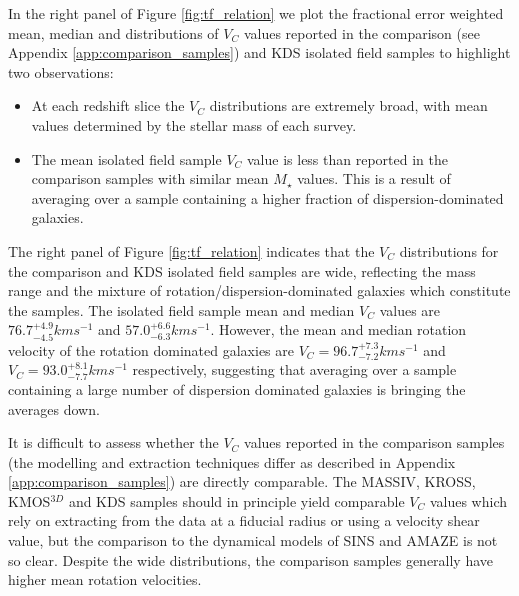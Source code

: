 \documentclass[fleqn,usenatbib]{mnras}
\begin{document}
In the right panel of Figure \ref{fig:tf_relation} we plot the fractional error weighted mean, median and distributions of $V_{C}$ values reported in the comparison (see Appendix \ref{app:comparison_samples}) and KDS isolated field samples to highlight two observations:
\begin{itemize}
    \item At each redshift slice the $V_{C}$ distributions are extremely broad, with mean values determined by the stellar mass of each survey.
    \item The mean isolated field sample $V_{C}$ value is less than reported in the comparison samples with similar mean $M_{\star}$ values.
    This is a result of averaging over a sample containing a higher fraction of dispersion-dominated galaxies.
\end{itemize}

The right panel of Figure \ref{fig:tf_relation} indicates that the $V_{C}$ distributions for the comparison and KDS isolated field samples are wide, reflecting the mass range and the mixture of rotation/dispersion-dominated galaxies which constitute the samples.
The isolated field sample mean and median $V_{C}$ values are $76.7^{+4.9}_{-4.5}kms^{-1}$ and $57.0^{+6.6}_{-6.3}kms^{-1}$.
However, the mean and median rotation velocity of the rotation dominated galaxies are $V_{C} = 96.7^{+7.3}_{-7.2}kms^{-1}$ and $V_{C} = 93.0^{+8.1}_{-7.7}kms^{-1}$ respectively, suggesting that averaging over a sample containing a large number of dispersion dominated galaxies is bringing the averages down.

It is difficult to assess whether the $V_{C}$ values reported in the comparison samples (the modelling and extraction techniques differ as described in Appendix \ref{app:comparison_samples}) are directly comparable.
The MASSIV, KROSS, KMOS$^{3D}$ and KDS samples should in principle yield comparable $V_{C}$ values which rely on extracting from the data at a fiducial radius or using a velocity shear value, but the comparison to the dynamical models of SINS and AMAZE is not so clear.
Despite the wide distributions, the comparison samples generally have higher mean rotation velocities. \\
\end{document}
